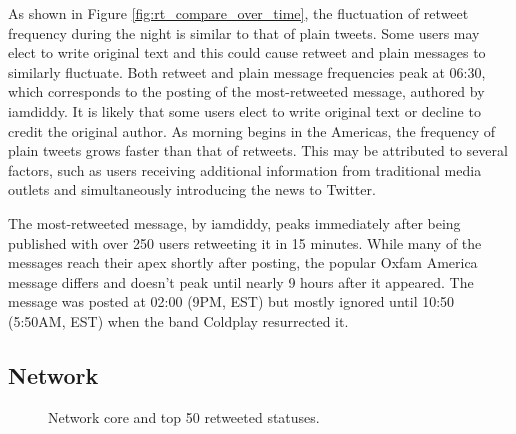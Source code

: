 \documentclass[a4paper, 11pt, titlepage]{article}
\begin{document}
As shown in Figure \ref{fig:rt_compare_over_time}, the fluctuation of retweet frequency during the night is similar to that of plain tweets.  Some users may elect to write original text and this could cause retweet and plain messages to similarly fluctuate.  Both retweet and plain message frequencies peak at 06:30, which corresponds to the posting of the most-retweeted message, authored by iamdiddy.  It is likely that some users elect to write original text or decline to credit the original author.  As morning begins in the Americas, the frequency of plain tweets grows faster than that of retweets.  This may be attributed to several factors, such as users receiving additional information from traditional media outlets and simultaneously introducing the news to Twitter.  

The most-retweeted message, by iamdiddy, peaks immediately after being published with over 250 users retweeting it in 15 minutes.  While many of the messages reach their apex shortly after posting, the popular Oxfam America message differs and doesn't peak until nearly 9 hours after it appeared.  The message was posted at 02:00 (9PM, EST) but mostly ignored until 10:50 (5:50AM, EST) when the band Coldplay resurrected it.

\subsection{Network}

\begin{figure}[h]
\centering
{}
\quad
{}
\caption{Network core and top 50 retweeted statuses.}
\end{figure}
\end{document}
